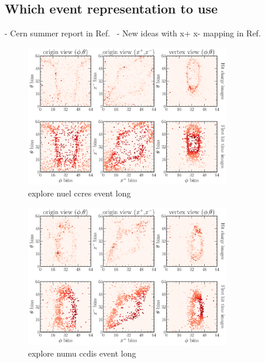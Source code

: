 \subsection{Which event representation to use} %
\label{sec:cvn_baseline_repr} %

- Cern summer report in Ref.~\cite{theodore2016}
- New ideas with x+ x- mapping in Ref.~\cite{berns2020}

\begin{figure} %
    \includegraphics[width=0.8\textwidth]{diagrams/7-cvn/chipsnet/explore_nuel_ccres_event.pdf}
    \caption[explore nuel ccres event short]
    {explore nuel ccres event long}
    \label{fig:explore_nuel_ccres_event}
\end{figure}

\begin{figure} %
    \includegraphics[width=0.8\textwidth]{diagrams/7-cvn/chipsnet/explore_numu_ccdis_event.pdf}
    \caption[explore numu ccdis event short]
    {explore numu ccdis event long}
    \label{fig:explore_numu_ccdis_event}
\end{figure}

